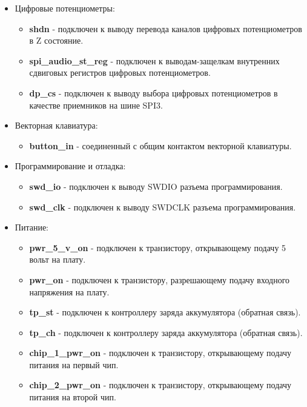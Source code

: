 \documentclass[a4paper, 12pt]{article}
\begin{document}
\begin{itemize}
	\item Цифровые потенциометры:
	\begin{itemize}
		\item \textbf{shdn} - подключен к выводу перевода каналов цифровых потенциометров в Z состояние.
		\item \textbf{spi\_audio\_st\_reg} - подключен к выводам-защелкам внутренних сдвиговых регистров цифровых потенциометров.
		\item \textbf{dp\_cs} - подключен к выводу выбора цифровых потенциометров в качестве приемников на шине SPI3.
	\end{itemize}

	\item Векторная клавиатура:
	\begin{itemize}
		\item \textbf{button\_in} - соединенный с общим контактом векторной клавиатуры.
	\end{itemize}

	\item Программирование и отладка:
	\begin{itemize}
		\item \textbf{swd\_io} - подключен к выводу SWDIO разъема программирования.
		\item \textbf{swd\_clk} - подключен к выводу SWDCLK разъема программирования.
	\end{itemize}

	\item Питание:
	\begin{itemize}
		\item \textbf{pwr\_5\_v\_on} - подключен к транзистору, открывающему подачу 5 вольт на плату.
		\item \textbf{pwr\_on} - подключен к транзистору, разрешающему подачу входного напряжения на плату.
		\item \textbf{tp\_st} - подключен к контроллеру заряда аккумулятора (обратная связь).
		\item \textbf{tp\_ch} - подключен к контроллеру заряда аккумулятора (обратная связь).
		\item \textbf{chip\_1\_pwr\_on} - подключен к транзистору, открывающему подачу питания на первый чип.
		\item \textbf{chip\_2\_pwr\_on} - подключен к транзистору, открывающему подачу питания на второй чип.
	\end{itemize}
	

\end{itemize}
\end{document}
